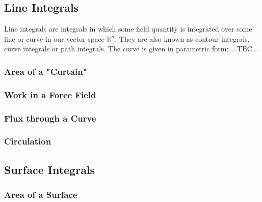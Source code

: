 \subsection{Line Integrals}
Line integrals are integrals in which some field quantity is integrated over some line or curve in our vector space $\mathbb{R}^n$. They are also known as contour integrals, curve integrals or path integrals. The curve is given in parametric form:
...TBC...

\subsubsection{Area of a "Curtain"}



\subsubsection{Work in a Force Field}


\subsubsection{Flux through a Curve}


\subsubsection{Circulation}




\subsection{Surface Integrals}
\subsubsection{Area of a Surface}

